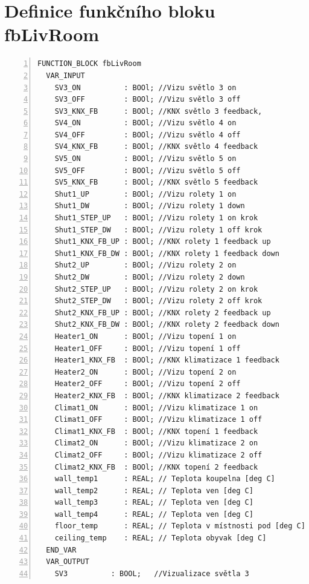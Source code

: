 \chapter{Definice funkčního bloku fbLivRoom}
\label{apend:fbLivRoom}
\begin{lstlisting}[language=ST, breaklines=true, numbers=left, numberstyle=\small, numbersep=10pt, frame=single, basicstyle=\ttfamily\small, caption={Definice funkčního bloku fbLivRoom}, label={lst:fbLivRoom}]
FUNCTION_BLOCK fbLivRoom
  VAR_INPUT
    SV3_ON          : BOOl; //Vizu světlo 3 on
    SV3_OFF         : BOOl; //Vizu světlo 3 off
    SV3_KNX_FB      : BOOl; //KNX světlo 3 feedback,
    SV4_ON          : BOOl; //Vizu světlo 4 on
    SV4_OFF         : BOOl; //Vizu světlo 4 off
    SV4_KNX_FB      : BOOl; //KNX světlo 4 feedback
    SV5_ON          : BOOl; //Vizu světlo 5 on
    SV5_OFF         : BOOl; //Vizu světlo 5 off
    SV5_KNX_FB      : BOOl; //KNX světlo 5 feedback
    Shut1_UP        : BOOl; //Vizu rolety 1 on
    Shut1_DW        : BOOl; //Vizu rolety 1 down
    Shut1_STEP_UP   : BOOl; //Vizu rolety 1 on krok
    Shut1_STEP_DW   : BOOl; //Vizu rolety 1 off krok
    Shut1_KNX_FB_UP : BOOl; //KNX rolety 1 feedback up
    Shut1_KNX_FB_DW : BOOl; //KNX rolety 1 feedback down
    Shut2_UP        : BOOl; //Vizu rolety 2 on
    Shut2_DW        : BOOl; //Vizu rolety 2 down
    Shut2_STEP_UP   : BOOl; //Vizu rolety 2 on krok
    Shut2_STEP_DW   : BOOl; //Vizu rolety 2 off krok
    Shut2_KNX_FB_UP : BOOl; //KNX rolety 2 feedback up
    Shut2_KNX_FB_DW : BOOl; //KNX rolety 2 feedback down
    Heater1_ON      : BOOl; //Vizu topení 1 on
    Heater1_OFF     : BOOl; //Vizu topení 1 off
    Heater1_KNX_FB  : BOOl; //KNX klimatizace 1 feedback
    Heater2_ON      : BOOl; //Vizu topení 2 on
    Heater2_OFF     : BOOl; //Vizu topení 2 off
    Heater2_KNX_FB  : BOOl; //KNX klimatizace 2 feedback
    Climat1_ON      : BOOl; //Vizu klimatizace 1 on
    Climat1_OFF     : BOOl; //Vizu klimatizace 1 off
    Climat1_KNX_FB  : BOOl; //KNX topení 1 feedback
    Climat2_ON      : BOOl; //Vizu klimatizace 2 on
    Climat2_OFF     : BOOl; //Vizu klimatizace 2 off
    Climat2_KNX_FB  : BOOl; //KNX topení 2 feedback
    wall_temp1      : REAL; // Teplota koupelna [deg C]
    wall_temp2      : REAL; // Teplota ven [deg C]
    wall_temp3      : REAL; // Teplota ven [deg C]
    wall_temp4      : REAL; // Teplota ven [deg C]
    floor_temp      : REAL; // Teplota v místnosti pod [deg C]
    ceiling_temp    : REAL; // Teplota obyvak [deg C]
  END_VAR
  VAR_OUTPUT
    SV3          : BOOL;   //Vizualizace světla 3

\end{lstlisting}

